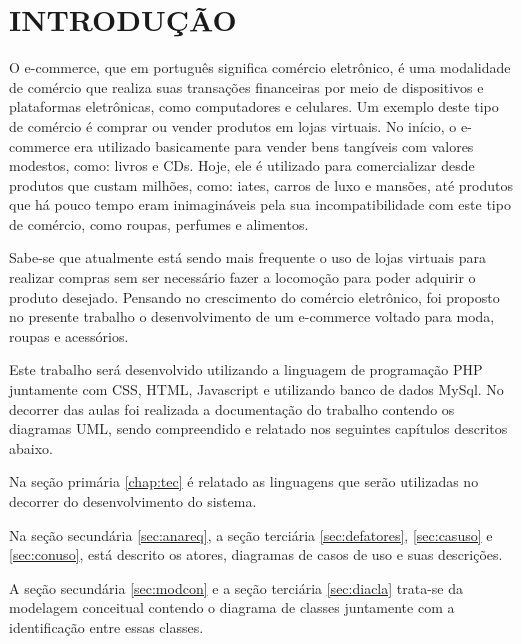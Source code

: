 
\chapter{INTRODUÇÃO}
\label{chap:introducao}


O e-commerce, que em português significa comércio eletrônico, é uma modalidade de comércio que realiza suas transações financeiras por meio de dispositivos e plataformas eletrônicas, como computadores e celulares. Um exemplo deste tipo de comércio é comprar ou vender produtos em lojas virtuais. 
No início, o e-commerce era utilizado basicamente para vender bens tangíveis com valores modestos, como: livros e CDs. Hoje, ele é utilizado para comercializar desde produtos que custam milhões, como: iates, carros de luxo e mansões, até produtos que há pouco tempo eram inimagináveis pela sua incompatibilidade com este tipo de comércio, como roupas, perfumes e alimentos. \cite{ecomm} %


Sabe-se que atualmente está sendo mais frequente o uso de lojas virtuais para realizar compras sem ser necessário fazer a locomoção para poder adquirir o produto desejado. Pensando no crescimento do comércio eletrônico, foi proposto no presente trabalho o desenvolvimento de um e-commerce voltado para moda, roupas e acessórios. 

Este trabalho será desenvolvido utilizando a linguagem de programação PHP juntamente com CSS, HTML, Javascript e  utilizando banco de dados MySql.
No decorrer das aulas foi realizada a documentação do trabalho contendo os diagramas UML, sendo compreendido e relatado nos seguintes capítulos descritos abaixo.

Na seção primária \ref{chap:tec} é relatado as linguagens que serão utilizadas no decorrer do desenvolvimento do sistema.

Na seção secundária \ref{sec:anareq}, a seção terciária \ref{sec:defatores}, \ref{sec:casuso} e \ref{sec:conuso}, está descrito os atores, diagramas de casos de uso e suas descrições.

A seção secundária \ref{sec:modcon} e a seção terciária \ref{sec:diacla} trata-se da modelagem conceitual contendo o diagrama de classes juntamente com a identificação entre essas classes.

